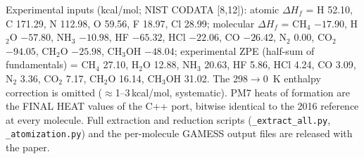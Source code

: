 \documentclass[preprint,12pt]{elsarticle}
\begin{document}
Experimental inputs (kcal/mol; NIST CODATA [8,12]): atomic $\Delta H_f$ = H 52.10, C 171.29, N 112.98, O 59.56, F 18.97, Cl 28.99; molecular $\Delta H_f$ = CH$_4$ $-17.90$, H$_2$O $-57.80$, NH$_3$ $-10.98$, HF $-65.32$, HCl $-22.06$, CO $-26.42$, N$_2$ 0.00, CO$_2$ $-94.05$, CH$_2$O $-25.98$, CH$_3$OH $-48.04$; experimental ZPE (half-sum of fundamentals) = CH$_4$ 27.10, H$_2$O 12.88, NH$_3$ 20.63, HF 5.86, HCl 4.24, CO 3.09, N$_2$ 3.36, CO$_2$ 7.17, CH$_2$O 16.14, CH$_3$OH 31.02. The 298$\to$0~K enthalpy correction is omitted ($\approx$1--3\,kcal/mol, systematic). PM7 heats of formation are the FINAL HEAT values of the C++ port, bitwise identical to the 2016 reference at every molecule. Full extraction and reduction scripts (\texttt{\_extract\_all.py}, \texttt{\_atomization.py}) and the per-molecule GAMESS output files are released with the paper.
\end{document}
